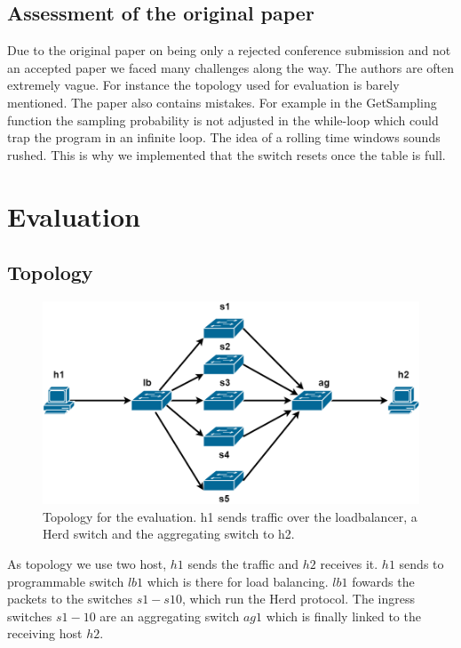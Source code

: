 \documentclass[11pt,oneside,a4paper]{article}
\begin{document}
\subsection{Assessment of the original paper} \label{original_paper}
Due to the original paper on being only a rejected conference submission and not an accepted paper we faced many challenges along the way. The authors are often extremely vague. For instance the topology used for evaluation is barely mentioned. The paper also contains mistakes. For example in the GetSampling function the sampling probability is not adjusted in the while-loop which could trap the program in an infinite loop. The idea of a rolling time windows sounds rushed. This is why we implemented that the switch resets once the table is full.


\section{Evaluation}
\subsection{Topology} \label{topology}

\begin{figure}
	\centering
	\includegraphics[width=1\textwidth]{figures/Herd_topology}
	\caption{Topology for the evaluation. h1 sends traffic over the loadbalancer, a Herd switch and the aggregating switch to h2.}
	\label{fig:topology_fig}
\end{figure}

As topology we use two host, $h1$ sends the traffic and $h2$ receives it. $h1$ sends to programmable switch $lb1$ which is there for load balancing. $lb1$ fowards the packets to the switches $s1 - s10$, which run the Herd protocol. The ingress switches $s1 - 10$ are an aggregating switch $ag1$ which is finally linked to the receiving host $h2$.\\
\end{document}
